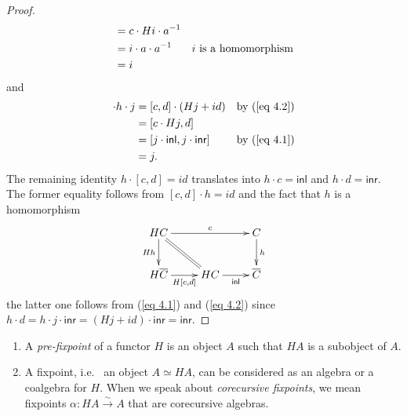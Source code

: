 \documentclass{LMCS}
\theoremstyle{plain}
\theoremstyle{definition}
\numberwithin{equation}{section}
\begin{document}
\begin{proof}
\begin{align}
&=c\cdot Hi\cdot a^{-1}\notag\\
&=i\cdot a\cdot a^{-1}&\text{$i$ is a homomorphism}\notag\\
&=i\notag
\end{align}
and
\begin{align}
[c,d]\cdot h\cdot j &=[c,d]\cdot(Hj+id)&\text{by (\ref{eq 4.2})}\notag\\
&=[c\cdot Hj,d]\notag\\
&=[j\cdot\mathsf{inl},j\cdot\mathsf{inr}]&\text{by (\ref{eq 4.1})}\notag\\
&=j.\notag
\end{align}
The remaining identity $h\cdot [c,d]=id$ translates into $h\cdot c=\mathsf{inl}$ and $h\cdot d=\mathsf{inr}$. The former equality follows from $[c,d]\cdot h=id$ and the fact that $h$ is a homomorphism
$$\xymatrix{
HC\ar[rr]^-c\ar[d]_-{Hh}\ar@{=}[dr]&&C\ar[d]^-h\\
H\overline C\ar[r]_-{H[c,d]}&HC\ar[r]_-{\mathsf{inl}}&\overline C
}$$
the latter one follows from (\ref{eq 4.1}) and (\ref{eq 4.2}) since $h\cdot d=h\cdot j\cdot\mathsf{inr}=(Hj+id)\cdot\mathsf{inr}=\mathsf{inr}$.
\end{proof}

\begin{rem}\label{remark pre fixed point}\hfill
\begin{enumerate}[label=\({\alph*}]
\item A {\it pre-fixpoint} of a functor $H$ is an object $A$ such that $HA$ is a subobject of $A$.

\item A fixpoint, i.\;e.~ an object $A\simeq HA$, can be considered as
  an algebra or a coalgebra for $H$. When we speak about {\it
    corecursive fixpoints}, we mean fixpoints
  $\alpha:HA\stackrel{\sim}\rightarrow A$ that are corecursive
  algebras.
\end{enumerate}
\end{rem}
\end{document}
